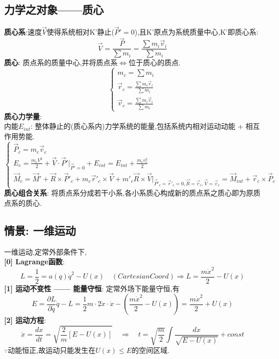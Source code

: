 \documentclass{article}
\begin{document}
\subsection{力学之对象——质心}
\textbf{质心系}:\exists 速度$\vec V$使得系统相对K'静止($\vec P' = 0$),且K'原点为系统质量中心,K'即质心系:
$$\vec V = \frac{\vec P}{\sum m_i} = \frac{\sum m_i \vec v_i}{\sum m_i}$$
\textbf{质心}: 质点系的质量中心,并将质点系$\Leftrightarrow$位于质心的质点.
\begin{displaymath}
    \left\{ \begin{array}{ll}
    m_c = \sum m_i\\
    \vec r_c = \frac{\sum m_i \vec r_i}{\sum m_i}\\
    \vec v_c = \frac{\sum m_i \vec v_i}{\sum m_i}
    \end{array} \right.
\end{displaymath}
\textbf{质心力学量}:\\
内能$E_{int}$: 整体静止的(质心系内)力学系统的能量,包括系统内相对运动动能 + 相互作用势能.\\
\begin{displaymath}
    \left\{ \begin{array}{ll}
    \vec P_c = m_c \vec v_c\\
    E_c = \frac{m_c V^2}{2} + \vec V \cdot \vec P' |_{\vec P'=0} + E_{int} = E_{int} + \frac{m_c v_c^2}{2}\\
    \vec M_c = \vec M' + \vec R \times \vec P'_c + m_c \vec r'_c \times \vec V + m'_c \vec R \times \vec V|_{\vec P'_c =\vec r'_c = 0, \vec R =\vec r_c, \vec V =\vec v_c} = \vec M_{int} + \vec r_c \times \vec P_c 
    \end{array} \right.
\end{displaymath}
\textbf{质心组合关系}: 将质点系分成若干小系,各小系质心构成新的质点系之质心即为原质点系的质心.


\subsection{情景: 一维运动}
一维运动,定常外部条件下,\\
\textbf{[0] Lagrange函数}:
$$L = \frac{1}{2} = a(q) \dot q^2 - U(x)\quad (CartesianCoord)\Rightarrow L = \frac{m \dot x^2}{2} - U(x)$$
\textbf{[1] 运动不变性 —— 能量守恒}: 定常外场下能量守恒,有
$$E = \frac{\partial L}{\partial \dot q}\dot q - L = \frac{1}{2}m\cdot 2 \dot x \cdot \dot x - (\frac{m \dot x^2}{2} - U(x)) = \frac{m \dot x^2}{2} + U(x) $$
\textbf{[2] 运动方程}:
$$\dot x = \frac{dx}{dt} = \sqrt{\frac{2}{m}[E - U(x)]}\quad \Rightarrow \quad t = \sqrt{\frac{m}{2}} \int \frac{dx}{\sqrt{E - U(x)}} + const$$
$\because$动能恒正,故运动只能发生在$U(x) \leqslant E$的空间区域.
\end{document}
